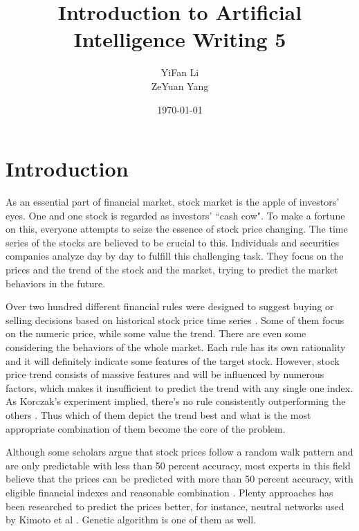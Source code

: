 \documentclass{article}
\title{Introduction to Artificial Intelligence Writing 5}
\author{YiFan Li\\ZeYuan Yang}
\date{\today}
\begin{document}
\maketitle
{}



\section{Introduction}

As an essential part of financial market, stock market is the apple of investors' eyes.
One and one stock is regarded as investors' ``cash cow".
To make a fortune on this, everyone attempts to seize the essence of stock price changing.
The time series of the stocks are believed to be crucial to this.
Individuals and securities companies analyze day by day to fulfill this challenging task.
They focus on the prices and the trend of the stock and the market,
trying to predict the market behaviors in the future.

Over two hundred different financial rules were designed to
suggest buying or selling decisions based on historical stock price time series \cite{stock-timing-using-genetic-algorithms}.
Some of them focus on the numeric price, while some value the trend.
There are even some considering the behaviors of the whole market.
Each rule has its own rationality and it will definitely indicate some features of the target stock.
However, stock price trend consists of massive features and will be influenced by numerous factors,
which makes it insufficient to predict the trend with any single one index.
As Korczak's experiment implied, there's no rule consistently outperforming the others \cite{stock-timing-using-genetic-algorithms}.
Thus which of them depict the trend best and what is the most appropriate combination of them become the core of the problem.

Although some scholars argue that stock prices follow a random walk pattern
and are only predictable with less than 50 percent accuracy,
most experts in this field believe that the prices can be predicted with more than 50 percent accuracy,
with eligible financial indexes and reasonable combination \cite{stock-market-prediction-with-multiple-classifiers}.
Plenty approaches has been researched to predict the prices better,
for instance, neutral networks used by Kimoto et al \cite{stock-market-prediction-system-with-modular-neural-networks}.
Genetic algorithm is one of them as well.
\end{document}

